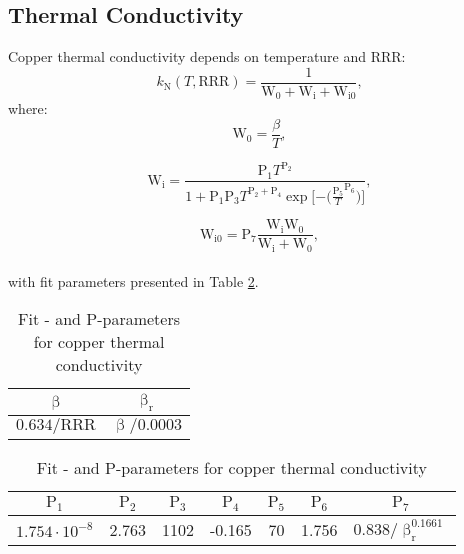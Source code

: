 \subsection{Thermal Conductivity}
\label{subsection:copper_thermal_conductivity}
Copper thermal conductivity depends on temperature and RRR:
\begin{equation}
    k_\text{N}(T, \text{RRR}) = \frac{1}{\text{W}_\text{0} + \text{W}_\text{i} + \text{W}_\text{i0}}, 
\end{equation}
where:
\begin{equation}
    \text{W}_\text{0} = \frac{\beta}{T},
\end{equation}

\begin{equation}
    \text{W}_\text{i} = \frac{\text{P}_\text{1} T^{\text{P}_\text{2}}}{1+\text{P}_\text{1}  \text{P}_\text{3}  T^{\text{P}_\text{2} + \text{P}_\text{4}}  \exp{[-(\frac{\text{P}_\text{5}}{T}}^{\text{P}_\text{6}})]},
\end{equation}

\begin{equation}
    \text{W}_\text{i0} = \text{P}_\text{7} \frac{\text{W}_\text{i} \text{W}_\text{0}}{\text{W}_\text{i} + \text{W}_\text{0}},
\end{equation}
\\
with fit parameters presented in Table \ref{table:nist_cu_k_parameters}.

\begin{table}[H]
    \caption{Fit \textbeta- and P-parameters for copper thermal conductivity} 
    \vspace{-1.em} 
    \fontsize{10}{10}
    \selectfont 
    \renewcommand{\arraystretch}{1.5}
    \begin{center}
    \begin{tabular}{ cc }  
    $\upbeta$ & $\upbeta_\text{r}$ \\
    \hline
    $0.634/\text{RRR}$ & $\upbeta/0.0003$ \\
    \hline
    \end{tabular}
    
    \begin{tabular}{ ccccccc }  
    $\text{P}_1$ & $\text{P}_2$ & $\text{P}_3$ & $\text{P}_4$ & $\text{P}_5$ & $\text{P}_6$ & $\text{P}_7$ \\
    \hline
    $1.754\cdot10^{-8}$ & 2.763 & 1102 & -0.165 & 70 & 1.756 & $0.838/\upbeta_\text{r}^{0.1661}$ \\
    \hline 
    \end{tabular}
    \end{center}  
     \label{table:nist_cu_k_parameters} 
 \end{table}
 
